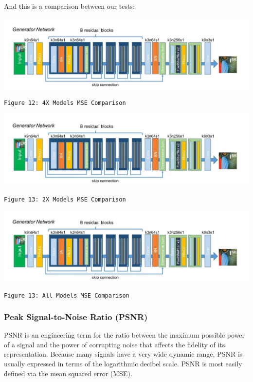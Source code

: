 \documentclass[12pt]{article}
\begin{document}
				And this is a comparison between our tests:
				\begin{center}
					\vspace{0.1in}
					\includegraphics[width=6in]{Images/Generator.jpeg}
				
					\texttt{Figure 12: 4X Models MSE Comparison}
					\vspace{0.1in}
				\end{center}
				\begin{center}
					\vspace{0.1in}
					\includegraphics[width=6in]{Images/Generator.jpeg}
				
					\texttt{Figure 13: 2X Models MSE Comparison}
					\vspace{0.1in}
				\end{center}
				\begin{center}
					\vspace{0.1in}
					\includegraphics[width=6in]{Images/Generator.jpeg}
				
					\texttt{Figure 13: All Models MSE Comparison}
					\vspace{0.1in}
				\end{center}
			\subsubsection{Peak Signal-to-Noise Ratio (PSNR)}
				\textsc{PSNR} is an engineering term for the ratio between the maximum possible power of a signal and the power of corrupting noise that affects the fidelity of its representation. Because many signals have a very wide dynamic range, PSNR is usually expressed in terms of the logarithmic decibel scale. PSNR is most easily defined via the mean squared error (MSE).
				
\end{document}
